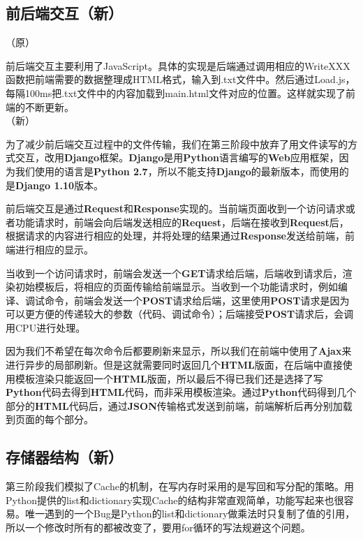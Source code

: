 \documentclass[a4paper,11pt,UTF8]{ctexart}
\begin{document}
\begin{sloppypar}
\subsection{{\bf 前后端交互（新）}}

（原）

前后端交互主要利用了JavaScript。具体的实现是后端通过调用相应的WriteXXX函数把前端需要的数据整理成HTML格式，输入到.txt文件中。然后通过Load.js，每隔100ms把.txt文件中的内容加载到main.html文件对应的位置。这样就实现了前端的不断更新。\\

（新）

为了减少前后端交互过程中的文件传输，我们在第三阶段中放弃了用文件读写的方式交互，改用{\bf Django}框架。{\bf Django}是用{\bf Python}语言编写的{\bf Web}应用框架，因为我们使用的语言是{\bf Python 2.7}，所以不能支持{\bf Django}的最新版本，而使用的是{\bf Django 1.10}版本。

前后端交互是通过{\bf Request}和{\bf Response}实现的。当前端页面收到一个访问请求或者功能请求时，前端会向后端发送相应的{\bf Request}，后端在接收到{\bf Request}后，根据请求的内容进行相应的处理，并将处理的结果通过{\bf Response}发送给前端，前端进行相应的显示。

当收到一个访问请求时，前端会发送一个{\bf GET}请求给后端，后端收到请求后，渲染初始模板后，将相应的页面传输给前端显示。当收到一个功能请求时，例如编译、调试命令，前端会发送一个{\bf POST}请求给后端，这里使用{\bf POST}请求是因为可以更方便的传递较大的参数（代码、调试命令）；后端接受{\bf POST}请求后，会调用CPU进行处理。

因为我们不希望在每次命令后都要刷新来显示，所以我们在前端中使用了{\bf Ajax}来进行异步的局部刷新。但是这就需要同时返回几个{\bf HTML}版面，在后端中直接使用模板渲染只能返回一个{\bf HTML}版面，所以最后不得已我们还是选择了写{\bf Python}代码去得到{\bf HTML}代码，而非采用模板渲染。通过{\bf Python}代码得到几个部分的{\bf HTML}代码后，通过{\bf JSON}传输格式发送到前端，前端解析后再分别加载到页面的每个部分。

\subsection{{\bf 存储器结构（新）}}

第三阶段我们模拟了Cache的机制，在写内存时采用的是写回和写分配的策略。用Python提供的list和dictionary实现Cache的结构非常直观简单，功能写起来也很容易。唯一遇到的一个Bug是Python的list和dictionary做乘法时只复制了值的引用，所以一个修改时所有的都被改变了，要用for循环的写法规避这个问题。


\end{sloppypar}
\end{document}
